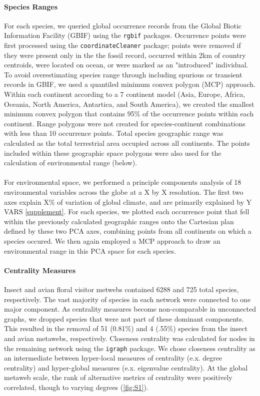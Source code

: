 \documentclass[12pt]{article}
\begin{document}
\paragraph*{Species Ranges}
For each species, we queried global occurrence records from the Global Biotic Information Facility (GBIF) using the \texttt{rgbif} packages. Occurrence points were first processed using the \texttt{coordinateCleaner} package; points were removed if they were present only in the the fossil record, occurred within 2km of country centroids, were located on ocean, or were marked as an "introduced" individual. To avoid overestimating species range through including spurious or transient records in GBIF, we used a quantiled minimum convex polygon (MCP) approach. Within each continent according to a 7 continent model (Asia, Europe, Africa, Oceania, North America, Antartica, and South America), we created the smallest minimum convex polygon that contains 95\% of the occurrence points within each continent. Range polygons were not created for species-continent combinations with less than 10 occurrence points. Total species geographic range was calculated as the total terrestrial area occupied across all continents. The points included within these geographic space polygons were also used for the calculation of environmental range (below). 


\paragraph{} For environmental space, we performed a principle components analysis of 18 environmental variables across the globe at a X by X resolution. The first two axes explain X\% of variation of global climate, and are primarily explained by Y VARS \ref{supplement}. For each species, we plotted each occurrence point that fell within the previously calculated geographic ranges onto the Cartesian plan defined by these two PCA axes, combining points from all continents on which a species occured. We then again employed a MCP approach to draw an environmental range in this PCA space for each species. 

\paragraph*{Centrality Measures}
Insect and avian floral visitor metwebs contained 6288 and 725 total species, respectively. The vast majority of species in each network were connected to one major component. As centrality measures become non-comparable in unconnected graphs, we dropped species that were not part of these dominant components. This resulted in the removal of 51 (0.81\%) and 4 (.55\%) species from the insect and avian metawebs, respectively. Closeness centrality was calculated for nodes in the remaining network using the \texttt{igraph} package. We chose closeness centrality as an intermediate between hyper-local measures of centrality (e.x. degree centrality) and hyper-global measures (e.x. eigenvalue centrality). At the global metaweb scale, the rank of alternative metrics of centrality were positively correlated, though to varying degrees (\ref{fig:S1}).
\end{document}
